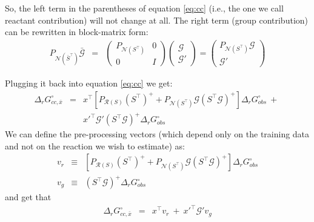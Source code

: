 \documentclass[11pt]{article}
\newcommand{\Gmat}{\mathcal{G}}
\newcommand{\PRmat}[1]{P_{\mathcal{R}\left(#1\right)}}
\newcommand{\PNmat}[1]{P_{\mathcal{N}\left(#1\right)}}
\begin{document}
So, the left term in the parentheses of equation \ref{eq:cc} (i.e., the one we call reactant contribution) will not change at all. The right term (group contribution) can be rewritten in block-matrix form:
\begin{eqnarray}\label{eq:P_N_ST_G}
\PNmat{\bar{S}^\top} \bar{\Gmat} &=& 
\left( \begin{array}{c|c} \PNmat{S^\top} & 0 \\ \hline 0 & I \end{array} \right)
\left( \begin{array}{c} \Gmat \\ \hline \Gmat'\end{array} \right)
 = \left( \begin{array}{c} \PNmat{S^\top} \Gmat \\ \hline \Gmat' \end{array} \right)
\end{eqnarray}

Plugging it back into equation \ref{eq:cc} we get:
\begin{eqnarray}
\Delta_{r}G_{cc,\bar{x}}^{\circ} &=& 
    x^\top \left[
	\PRmat{S} \left(S^{\top}\right)^{+} +
	\PNmat{S^\top} \Gmat  \left(S^{\top}\Gmat\right)^{+} \right]\Delta_{r}G_{obs}^{\circ} ~+~ \nonumber\\ && 
	x'^\top \Gmat' \left(S^{\top}\Gmat\right)^{+} \Delta_{r}G_{obs}^{\circ}
\end{eqnarray}
We can define the pre-processing vectors (which depend only on the training data and not on the reaction we wish to estimate) as:
\begin{eqnarray}
	v_{r} &\equiv&
	\left[
		\PRmat{S} \left(S^{\top}\right)^{+} + 
		\PNmat{S^\top} \Gmat \left(S^{\top}\Gmat\right)^{+}
	\right]
	\Delta_{r}G_{obs}^{\circ}
\\
	v_g &\equiv& \left(S^{\top}\Gmat\right)^{+} \Delta_{r}G_{obs}^{\circ}
\end{eqnarray}
and get that
\begin{eqnarray}
\Delta_{r}G_{cc,\bar{x}}^{\circ} &=& x^\top v_r ~+~ x'^\top \Gmat' v_g
\end{eqnarray}
\end{document}
